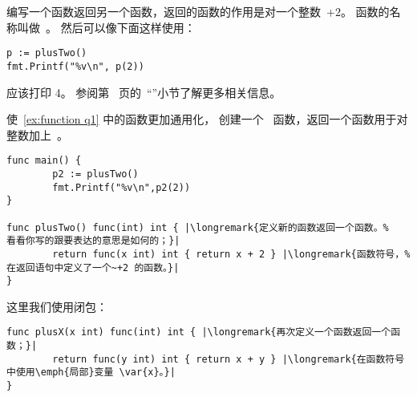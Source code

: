 \begin{Exercise}[title={函数返回一个函数},difficulty=1]
\label{ex:function}
\Question\label{ex:function q1} 编写一个函数返回另一个函数，返回的函数的作用是对一个整数~$+2$。
函数的名称叫做~。
然后可以像下面这样使用：
\begin{lstlisting}
p := plusTwo()
fmt.Printf("%v\n", p(2))
\end{lstlisting}
应该打印 4。
参阅第~\pageref{sec:callbacks} 页的~``''小节了解更多相关信息。

\Question\label{ex:function q2} 使~\ref{ex:function q1} 中的函数更加通用化，
创建一个~ 函数，返回一个函数用于对整数加上~。
\end{Exercise}

\begin{Answer}
\Question
\begin{lstlisting}
func main() {
        p2 := plusTwo()
        fmt.Printf("%v\n",p2(2))
}

func plusTwo() func(int) int { |\longremark{定义新的函数返回一个函数。%
看看你写的跟要表达的意思是如何的；}|
        return func(x int) int { return x + 2 } |\longremark{函数符号，%
在返回语句中定义了一个~+2 的函数。}|
}
\end{lstlisting}
\showremarks

\Question
这里我们使用闭包：
\begin{lstlisting}
func plusX(x int) func(int) int { |\longremark{再次定义一个函数返回一个函数；}|
        return func(y int) int { return x + y } |\longremark{在函数符号中使用\emph{局部}变量 \var{x}。}|
}
\end{lstlisting}
\showremarks
\end{Answer}
